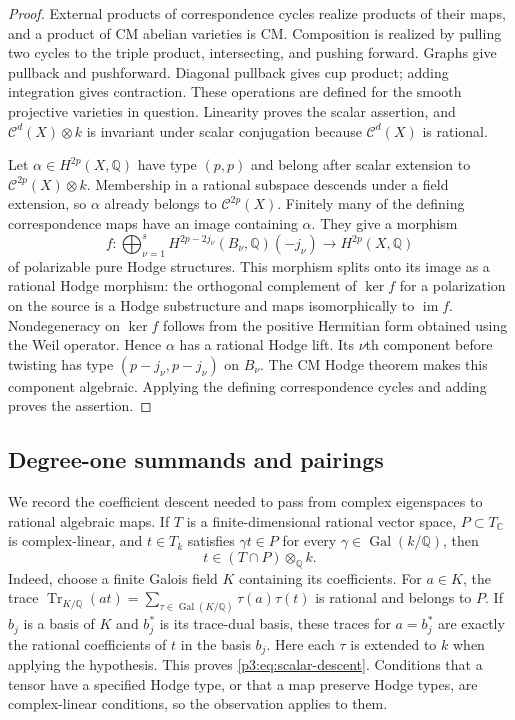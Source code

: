 \documentclass[11pt]{article}
\newcommand{\Q}{\mathbb Q}
\newcommand{\C}{\mathbb C}
\numberwithin{equation}{section}
\begin{document}
\begin{proof}
External products of correspondence cycles realize products of their
maps, and a product of CM abelian varieties is CM.  Composition is
realized by pulling two cycles to the triple product, intersecting,
and pushing forward.  Graphs give pullback and pushforward.
Diagonal pullback gives cup product; adding integration gives
contraction.
These operations are defined for the smooth projective varieties in
question.  Linearity proves the scalar assertion, and
$\mathcal C^d(X)\otimes k$ is invariant under scalar conjugation
because $\mathcal C^d(X)$ is rational.

Let $\alpha\in H^{2p}(X,\Q)$ have type $(p,p)$ and belong after
scalar extension to $\mathcal C^{2p}(X)\otimes k$.  Membership in
a rational subspace descends under a field extension, so $\alpha$
already belongs to $\mathcal C^{2p}(X)$.  Finitely many of the
defining correspondence maps have an image containing $\alpha$.
They give a morphism
\[
 f:\bigoplus_{\nu=1}^s
 H^{2p-2j_\nu}(B_\nu,\Q)(-j_\nu)
 \longrightarrow H^{2p}(X,\Q)
\]
of polarizable pure Hodge structures.  This morphism splits onto its
image as a rational Hodge morphism: the orthogonal complement of
$\ker f$ for a polarization on the source is a Hodge substructure
and maps isomorphically to $\operatorname{im}f$.  Nondegeneracy on
$\ker f$ follows from the positive Hermitian form obtained using
the Weil operator.  Hence $\alpha$ has a rational Hodge lift.  Its
$\nu$th component before twisting has type
$(p-j_\nu,p-j_\nu)$ on $B_\nu$.  The CM Hodge theorem makes this
component algebraic.  Applying the defining correspondence cycles
and adding proves the assertion.
\end{proof}

\subsection{Degree-one summands and pairings}

We record the coefficient descent needed to pass from complex
eigenspaces to rational algebraic maps.  If $T$ is a finite-dimensional
rational vector space, $P\subset T_\C$ is complex-linear, and
$t\in T_k$ satisfies $\gamma t\in P$ for every
$\gamma\in\operatorname{Gal}(k/\Q)$, then
\begin{equation}
 \label{p3:eq:scalar-descent}
 t\in (T\cap P)\otimes_\Q k.
\end{equation}
Indeed, choose a finite Galois field $K$ containing its coefficients.
For $a\in K$, the trace
$\operatorname{Tr}_{K/\Q}(at)=
\sum_{\tau\in\operatorname{Gal}(K/\Q)}\tau(a)\tau(t)$
is rational and belongs to $P$.  If $b_j$ is a basis of $K$ and
$b_j^*$ is its trace-dual basis, these traces for $a=b_j^*$
are exactly the rational coefficients of $t$ in the basis $b_j$.
Here each $\tau$ is extended to $k$ when applying the hypothesis.
This proves \eqref{p3:eq:scalar-descent}.  Conditions that a tensor
have a specified Hodge type, or that a map preserve Hodge types, are
complex-linear conditions, so the observation applies to them.
\end{document}

